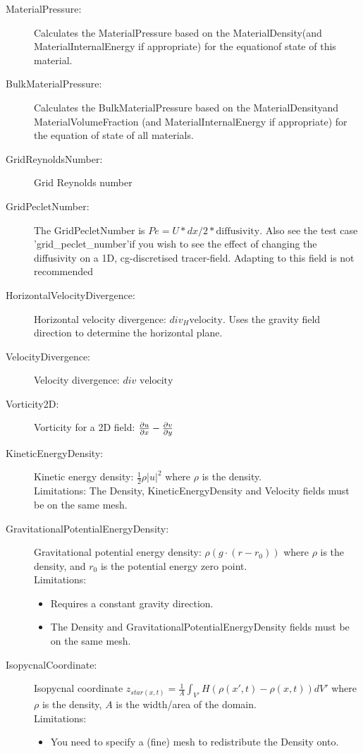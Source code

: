 \begin{description}
\item[MaterialPressure:]Calculates the MaterialPressure based on the MaterialDensity(and MaterialInternalEnergy if appropriate) for the equationof state of this material.  
\item[BulkMaterialPressure:]Calculates the BulkMaterialPressure based on the MaterialDensityand MaterialVolumeFraction (and MaterialInternalEnergy if appropriate) for the equation of state of all materials.  
\item[GridReynoldsNumber:]Grid Reynolds number  
\item[GridPecletNumber:]The GridPecletNumber is $Pe = U*dx/2*\mbox{diffusivity}$.
	Also see the test case 'grid\_peclet\_number'if you wish to see the effect of changing the diffusivity on a 1D, cg-discretised tracer-field.
	Adapting to this field is not recommended  
\item[HorizontalVelocityDivergence:]Horizontal velocity divergence: ${div}_H \mbox{velocity}$. Uses the gravity field direction to determine the horizontal plane.  
\item[VelocityDivergence:]Velocity divergence: $div \mbox{ velocity}$  
\item[Vorticity2D:]Vorticity for a 2D field: $\ppx{u} - \ppt[y]{v}$  
\item[KineticEnergyDensity:]Kinetic energy density: $\frac{1}{2} \rho |u|^2$ where $\rho$ is the density. \\
	Limitations: The Density, KineticEnergyDensity and Velocity fields must be on the same mesh.  
\item[GravitationalPotentialEnergyDensity:]Gravitational potential energy density: $\rho(g \cdot (r - r_0))$ where $\rho$ is the density, and $r_0$ is the potential energy zero point. \\
	Limitations: \begin{itemize}
	\item Requires a constant gravity direction. 
	\item The Density and GravitationalPotentialEnergyDensity fields must be on the same mesh. 
	\end{itemize}
\item[IsopycnalCoordinate:]Isopycnal coordinate
	$z_{star(x,t)} = \frac{1}{A} \int_{V'} H(\rho(x',t)-\rho(x,t)) dV'$ where $\rho$ is the density, $A$ is the width/area of the domain. \\
	Limitations:
	\begin{itemize}
	\item You need to specify a (fine) mesh to redistribute the Density onto.

\end{itemize}
\end{description}
